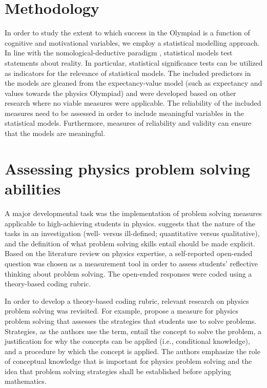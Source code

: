 \documentclass[D:/studies/WinnerS/Erhebungen/IPhO1718/paper/problem_solving/main/TaylorFrancis/interactapasample]{subfiles}
\begin{document}
\section{Methodology}

In order to study the extent to which success in the Olympiad is a function of cognitive and motivational variables, we employ a statistical modelling approach. In line with the nomological-deductive paradigm \cite{Bortz.2002}, statistical models test statements about reality. In particular, statistical significance tests can be utilized as indicators for the relevance of statistical models. The included predictors in the models are gleaned from the expectancy-value model (such as expectancy and values towards the physics Olympiad) \citep{Eccles.1983,Urhahne.2012} and were developed based on other research where no viable measures were applicable. The reliability of the included measures need to be assessed in order to include meaningful variables in the statistical models. Furthermore, measures of reliability and validity can ensure that the models are meaningful.


\section{Assessing physics problem solving abilities}

A major developmental task was the implementation of problem solving measures applicable to high-achieving students in physics. \cite{Maloney.2011} suggests that the nature of the tasks in an investigation (well- versus ill-defined; quantitative versus qualitative), and the definition of what problem solving skills entail should be made explicit. Based on the literature review on physics expertise, a self-reported open-ended question was chosen as a measurement tool in order to assess students' reflective thinking about problem solving. The open-ended responses were coded using a theory-based coding rubric.

In order to develop a theory-based coding rubric, relevant research on physics problem solving was revisited. For example, \cite{Leonard.1996} propose a measure for physics problem solving that assesses the strategies that students use to solve problems. Strategies, as the authors use the term, entail the concept to solve the problem, a justification for why the concepts can be applied (i.e., conditional knowledge), and a procedure by which the concept is applied. The authors emphasize the role of conceptual knowledge that is important for physics problem solving and the idea that problem solving strategies shall be established before applying mathematics. 
\end{document}
